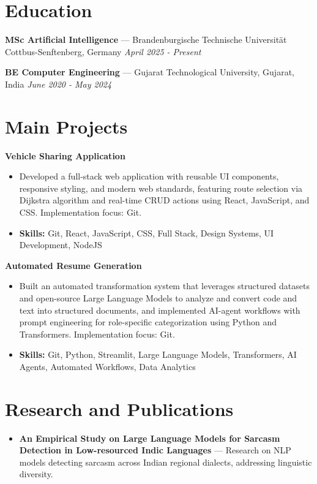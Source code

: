 \documentclass[a4paper,10pt]{article}
\begin{document}
\section*{Education}
\textbf{MSc Artificial Intelligence} — Brandenburgische Technische Universität Cottbus-Senftenberg, Germany \hfill \textit{April 2025 - Present}\par
\vspace{1.5pt}
\textbf{BE Computer Engineering} — Gujarat Technological University, Gujarat, India \hfill \textit{June 2020 - May 2024}\par

\section*{Main Projects}
\textbf{Vehicle Sharing Application}\par
\vspace{1pt}
\begin{itemize}
  \item Developed a full-stack web application with reusable UI components, responsive styling, and modern web standards, featuring route selection via Dijkstra algorithm and real-time CRUD actions using React, JavaScript, and CSS. Implementation focus: Git.
  \item \textbf{Skills:} Git, React, JavaScript, CSS, Full Stack, Design Systems, UI Development, NodeJS
\end{itemize}
\vspace{3pt}
\textbf{Automated Resume Generation}\par
\vspace{1pt}
\begin{itemize}
  \item Built an automated transformation system that leverages structured datasets and open-source Large Language Models to analyze and convert code and text into structured documents, and implemented AI-agent workflows with prompt engineering for role-specific categorization using Python and Transformers. Implementation focus: Git.
  \item \textbf{Skills:} Git, Python, Streamlit, Large Language Models, Transformers, AI Agents, Automated Workflows, Data Analytics
\end{itemize}

\section*{Research and Publications}
\begin{itemize}
\item \textbf{An Empirical Study on Large Language Models for Sarcasm Detection in Low-resourced Indic Languages} — Research on NLP models detecting sarcasm across Indian regional dialects, addressing linguistic diversity.
\end{itemize}
\end{document}
